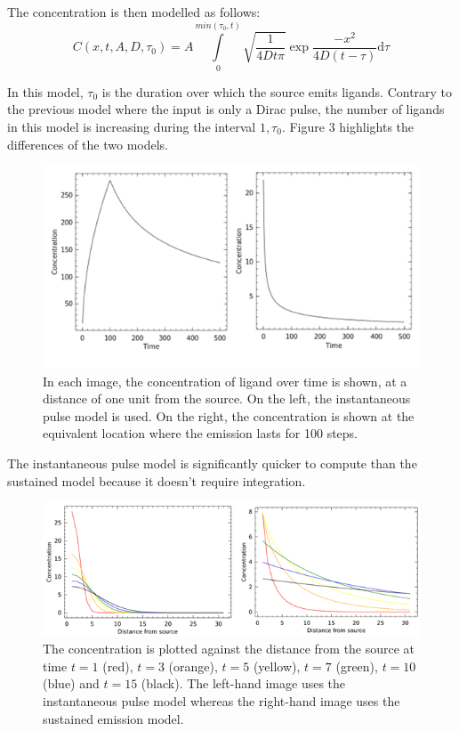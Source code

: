 \documentclass[12pt]{article}
\begin{document}
The concentration is then modelled as follows:
\begin{equation}
  C(x,t,A,D,\tau_0) = A\int\limits_0^{min(\tau_0,t)}\sqrt{\frac{1}{4Dt\pi}}\exp{\frac{-x^2}{4D(t-\tau)}}\mathrm{d}\tau
\end{equation}

In this model, \(\tau_0\) is the duration over which the 
source emits ligands. Contrary to the previous model where the input is 
only a Dirac pulse, the number of ligands in this model is increasing 
during the interval \(1,\tau_0\). Figure 3 
highlights the differences of the two models.

\begin{figure}[H]
\centering
\includegraphics[width=\textwidth]{media/sources.png}
\caption{In each image, the concentration of ligand over time is shown,
  at a distance of one unit from the source. On the left, the instantaneous
  pulse model is used. On the right, the concentration is shown at the
  equivalent location where the emission lasts for 100 steps.}
\end{figure}

The instantaneous pulse model is significantly quicker to compute than the
sustained model because it doesn't require integration.

\begin{figure}[H]
\centering
\includegraphics[width=\textwidth]{media/sources2.png}
\caption{The concentration is plotted against the distance from the source
  at time \(t=1\) (red), \(t=3\) 
  (orange), \(t=5\) (yellow), \(t=7\) (green), \(t=10\) (blue) and \(t=15\) (black).
  The left-hand image uses the instantaneous pulse model whereas the right-hand 
  image uses the sustained emission model.} 
\end{figure}
\end{document}
